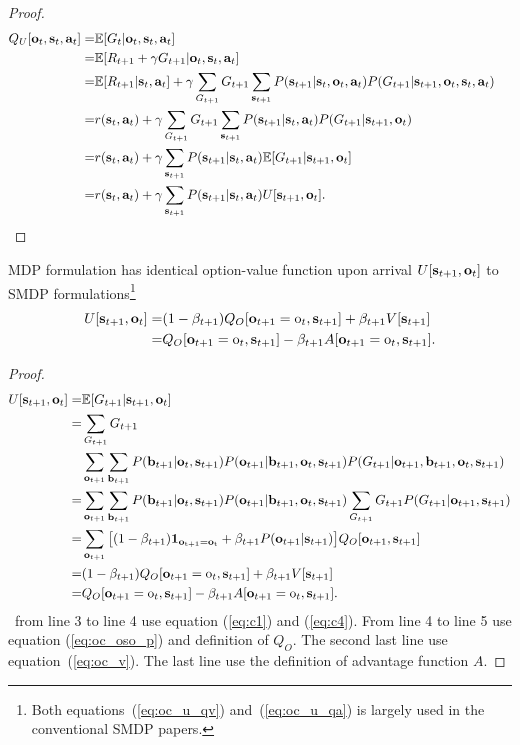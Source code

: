 \begin{proof}
\begin{align*}
  Q_U[{\mathbf{o}}_t, {\mathbf{s}}_t,{\mathbf{a}}_t] = &\mathbb{E}[G_t|{\mathbf{o}}_t, {\mathbf{s}}_t,{\mathbf{a}}_t] &\text{\;} \\
  = &\mathbb{E}[R_{t+1}+\gamma G_{t+1}|{\mathbf{o}}_t, {\mathbf{s}}_t,{\mathbf{a}}_t] \\
  =&\mathbb{E}[R_{t+1}|{\mathbf{s}}_t,{\mathbf{a}}_t]+\gamma\sum_{G_{t+1}}G_{t+1}\sum_{{\mathbf{s}}_{t+1}}P({\mathbf{s}}_{t+1}|{\mathbf{s}}_t,{\mathbf{o}}_t,{\mathbf{a}}_t)P(G_{t+1}|{\mathbf{s}}_{t+1},{\mathbf{o}}_t,{\mathbf{s}}_t,{\mathbf{a}}_t)\\
  =&r({\mathbf{s}}_t,{\mathbf{a}}_t)+\gamma\sum_{G_{t+1}}G_{t+1}\sum_{{\mathbf{s}}_{t+1}}P({\mathbf{s}}_{t+1}|{\mathbf{s}}_t,{\mathbf{a}}_t)P(G_{t+1}|{\mathbf{s}}_{t+1},{\mathbf{o}}_t)\\
  =&r({\mathbf{s}}_t,{\mathbf{a}}_t)+\gamma\sum_{{\mathbf{s}}_{t+1}}P({\mathbf{s}}_{t+1}|{\mathbf{s}}_t,{\mathbf{a}}_t)\mathbb{E}[ G_{t+1}|{\mathbf{s}}_{t+1},{\mathbf{o}}_t ]\\
  =&r({\mathbf{s}}_t,{\mathbf{a}}_t)+\gamma\sum_{{\mathbf{s}}_{t+1}}P({\mathbf{s}}_{t+1}|{\mathbf{s}}_t,{\mathbf{a}}_t)U[{\mathbf{s}}_{t+1},{\mathbf{o}}_t].
\end{align*}
\end{proof}


\begin{prop}
  \label{prop:oc_u}
  MDP formulation has identical option-value function upon
  arrival $U[{\mathbf{s}}_{t+1},{\mathbf{o}}_t]$ to SMDP
  formulations\footnote{Both equations~(\ref{eq:oc_u_qv})
    and~(\ref{eq:oc_u_qa}) is largely used in the conventional
    SMDP papers\cite{sutton1999between,bacon2017option}.}
 \begin{align}
\label{eq:oc_u_qv}  U[{\mathbf{s}}_{t+1},{\mathbf{o}}_t]= &(1-\beta_{t+1})Q_O[{\mathbf{o}}_{t+1}={\textnormal{o}}_t,{\mathbf{s}}_{t+1}] +\beta_{t+1}V[{\mathbf{s}}_{t+1}]\\
 \label{eq:oc_u_qa} = &Q_O[{\mathbf{o}}_{t+1}={\textnormal{o}}_t,{\mathbf{s}}_{t+1}] -\beta_{t+1}A[{\mathbf{o}}_{t+1}={\textnormal{o}}_t,{\mathbf{s}}_{t+1}].
\end{align}
\end{prop}


\begin{proof}
 \begin{align*}
  U[{\mathbf{s}}_{t+1},{\mathbf{o}}_t]=&\mathbb{E}[ G_{t+1}|{\mathbf{s}}_{t+1},{\mathbf{o}}_t ]\\
  =&\sum_{G_{t+1}}G_{t+1}\\
                       &\sum_{{\mathbf{o}}_{t+1}}\sum_{{\mathbf{b}}_{t+1}}P({\mathbf{b}}_{t+1}|{\mathbf{o}}_t,{\mathbf{s}}_{t+1})P({\mathbf{o}}_{t+1}|{\mathbf{b}}_{t+1},{\mathbf{o}}_t,{\mathbf{s}}_{t+1})P(G_{t+1}|{\mathbf{o}}_{t+1},{\mathbf{b}}_{t+1},{\mathbf{o}}_t,{\mathbf{s}}_{t+1})\\
  =&\sum_{{\mathbf{o}}_{t+1}}\sum_{{\mathbf{b}}_{t+1}}P({\mathbf{b}}_{t+1}|{\mathbf{o}}_t,{\mathbf{s}}_{t+1})P({\mathbf{o}}_{t+1}|{\mathbf{b}}_{t+1},{\mathbf{o}}_t,{\mathbf{s}}_{t+1})\sum_{G_{t+1}}G_{t+1}P(G_{t+1}|{\mathbf{o}}_{t+1},{\mathbf{s}}_{t+1})\\
  = &\sum_{{\mathbf{o}}_{t+1}}\big[(1-\beta_{t+1})\bm{1}_\mathrm{{\mathbf{o}}_{t+1}={\mathbf{o}}_t} +\beta_{t+1}P({\mathbf{o}}_{t+1}|{\mathbf{s}}_{t+1})\big]Q_O[{\mathbf{o}}_{t+1},{\mathbf{s}}_{t+1}]\\
  = &(1-\beta_{t+1})Q_O[{\mathbf{o}}_{t+1}={\textnormal{o}}_t,{\mathbf{s}}_{t+1}] +\beta_{t+1}V[{\mathbf{s}}_{t+1}]\\
  = &Q_O[{\mathbf{o}}_{t+1}={\textnormal{o}}_t,{\mathbf{s}}_{t+1}] -\beta_{t+1}A[{\mathbf{o}}_{t+1}={\textnormal{o}}_t,{\mathbf{s}}_{t+1}].
\end{align*}
~from line 3 to line 4 use equation (\ref{eq:c1}) and
(\ref{eq:c4}). From line 4 to line 5 use equation
(\ref{eq:oc_oso_p}) and definition of $Q_O$. The second last line
use equation~(\ref{eq:oc_v}). The last line use the definition of
advantage function $A$.
\end{proof}

